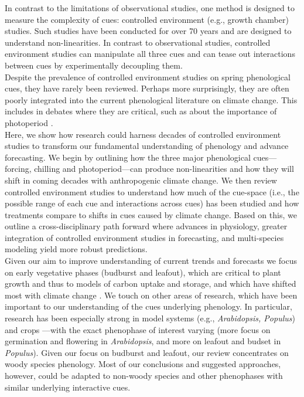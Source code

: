 \documentclass[11pt,letter]{article}
\begin{document}
In contrast to the limitations of observational studies, one method is designed to measure the complexity of cues: controlled environment (e.g., growth chamber) studies. Such studies have been conducted for over 70 years and are designed to understand non-linearities. In contrast to observational studies, controlled environment studies can manipulate all three cues and can tease out interactions between cues by experimentally decoupling them.\\ %

Despite the prevalence of controlled environment studies on spring phenological cues, they have rarely been reviewed. Perhaps more surprisingly, they are often poorly integrated into the current phenological literature on climate change. This includes in debates where they are critical, such as about the importance of photoperiod \citep[e.g.,][]{fu2015,richardson2018}.\\

Here, we show how research could harness decades of controlled environment studies to transform our fundamental understanding of phenology and advance forecasting. We begin by outlining how the three major phenological cues---forcing, chilling and photoperiod---can produce non-linearities and how they will shift in coming decades with anthropogenic climate change. We then review controlled environment studies to understand how much of the cue-space (i.e., the possible range of each cue and interactions across cues) has been studied and how treatments compare to shifts in cues caused by climate change. Based on this, we outline a cross-disciplinary path forward where advances in physiology, greater integration of controlled environment studies in forecasting, and multi-species modeling yield more robust predictions.\\

Given our aim to improve understanding of current trends and forecasts we focus on early vegetative phases (budburst and leafout), which are critical to plant growth and thus to models of carbon uptake and storage, and which have shifted most with climate change \citep{Cleland:2007or,IPCC:2014sm}. We touch on other areas of research, which have been important to our understanding of the cues underlying phenology. In particular, research has been especially strong in model systems (e.g., \emph{Arabidopsis, Populus}) and crops \citep{cesaraccio2004}---with the exact phenophase of interest varying (more focus on germination and flowering in \emph{Arabidopsis}, and more on leafout and budset in \emph{Populus}).  Given our focus on budburst and leafout, our review concentrates on woody species phenology. Most of our conclusions and suggested approaches, however, could be adapted to non-woody species and other phenophases with similar underlying interactive cues. \\
\end{document}

